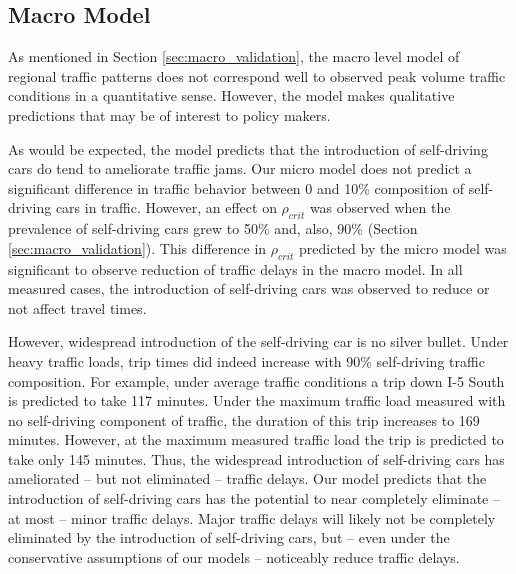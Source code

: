 \subsection{Macro Model}

As mentioned in Section \ref{sec:macro_validation}, the macro level model of regional traffic patterns does not correspond well to observed peak volume traffic conditions in a quantitative sense. However, the model makes qualitative predictions that may be of interest to policy makers.

As would be expected, the model predicts that the introduction of self-driving cars do tend to ameliorate traffic jams. Our micro model does not predict a significant difference in traffic behavior between 0 and 10\% composition of self-driving cars in traffic. However, an effect on $\rho_{crit}$ was observed when the prevalence of self-driving cars grew to 50\% and, also, 90\%  (Section \ref{sec:macro_validation}). This difference in $\rho_{crit}$ predicted by the micro model was significant to observe reduction of traffic delays in the macro model. In all measured cases, the introduction of self-driving cars was observed to reduce or not affect travel times. 

However, widespread introduction of the self-driving car is no silver bullet. Under heavy traffic loads, trip times did indeed increase with 90\% self-driving traffic composition. For example, under average traffic conditions a trip down I-5 South is predicted to take 117 minutes. Under the maximum traffic load measured with no self-driving component of traffic, the duration of this trip increases to 169 minutes. However, at the maximum measured traffic load the trip is predicted to take only 145 minutes. Thus, the widespread introduction of self-driving cars has ameliorated -- but not eliminated -- traffic delays. Our model predicts that the introduction of self-driving cars has the potential to near completely eliminate -- at most -- minor traffic delays. Major traffic delays will likely not be completely eliminated by the introduction of self-driving cars, but -- even under the conservative assumptions of our models -- noticeably reduce traffic delays.

